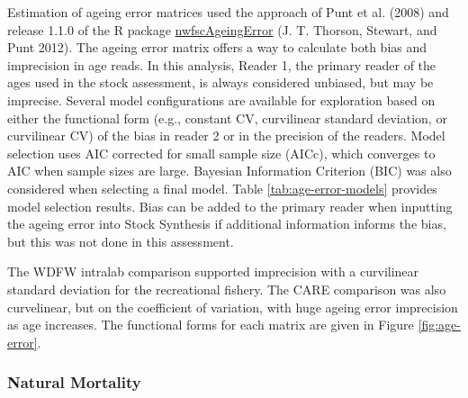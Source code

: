\documentclass[11pt,
  english,
  a4paper,
]{article}
\begin{document}
\leavevmode\tagmcend\tagstructend\par


Estimation of ageing error matrices used the approach of Punt et al. {(2008)\leavevmode\tagmcend\tagstructend} and release 1.1.0 of the R package \href{https://github.com/nwfsc-assess/nwfscAgeingError}{nwfscAgeingError} {(J. T. Thorson, Stewart, and Punt 2012)\leavevmode\tagmcend\tagstructend}. The ageing error matrix offers a way to calculate both bias and imprecision in age reads. In this analysis, Reader 1, the primary reader of the ages used in the stock assessment, is always considered unbiased, but may be imprecise. Several model configurations are available for exploration based on either the functional form (e.g., constant CV, curvilinear standard deviation, or curvilinear CV) of the bias in reader 2 or in the precision of the readers. Model selection uses AIC corrected for small sample size (AICc), which converges to AIC when sample sizes are large. Bayesian Information Criterion (BIC) was also considered when selecting a final model. Table \ref{tab:age-error-models} provides model selection results. Bias can be added to the primary reader when inputting the ageing error into Stock Synthesis if additional information informs the bias, but this was not done in this assessment.

\leavevmode\tagmcend\tagstructend\par


The WDFW intralab comparison supported imprecision with a curvilinear standard deviation for the recreational fishery. The CARE comparison was also curvelinear, but on the coefficient of variation, with huge ageing error imprecision as age increases. The functional forms for each matrix are given in Figure \ref{fig:age-error}.

\leavevmode\tagmcend\tagstructend\par


\hypertarget{natural-mortality}{%
\subsubsection{Natural Mortality}\label{natural-mortality}}
\end{document}
